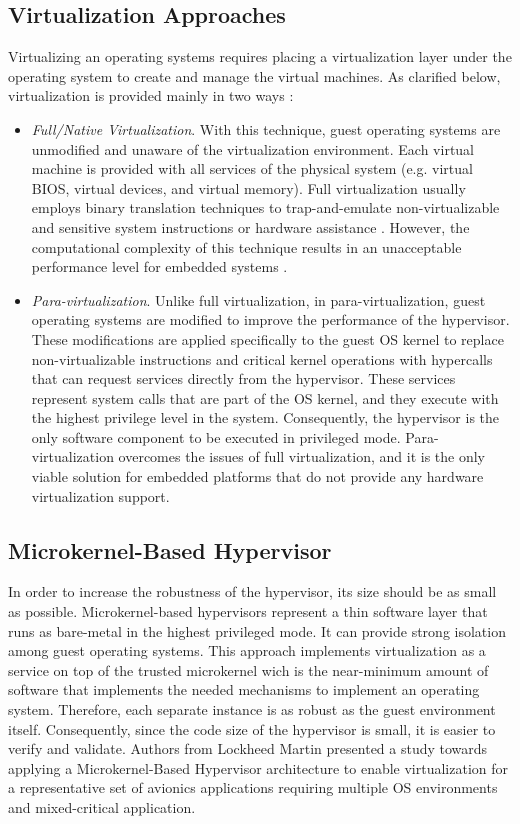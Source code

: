 \subsection{Virtualization Approaches}
Virtualizing an operating systems requires placing a virtualization layer under the operating system to create and manage the virtual machines. As clarified below, virtualization is provided mainly in two ways \cite{practicalmicrokernel}:
\begin{itemize}
\item \emph{Full/Native Virtualization}. With this technique, guest operating systems are unmodified and unaware of the virtualization environment. Each virtual machine is provided with all services of the physical system (e.g. virtual BIOS, virtual devices, and virtual memory). Full virtualization usually employs binary translation techniques to trap-and-emulate non-virtualizable and sensitive system instructions or hardware assistance \cite{vmwarevirtualization}. However, the computational complexity of this technique results in an unacceptable performance level for embedded systems \cite{Kleidermacher2013}.
\item \emph{Para-virtualization}. Unlike full virtualization, in para-virtualization, guest operating systems are modified to improve the performance of the hypervisor. These modifications are applied specifically to the guest OS kernel to replace non-virtualizable instructions and critical kernel operations with hypercalls that can request services directly from the hypervisor. These services represent system calls that are part of the OS kernel, and they execute with the highest privilege level in the system. Consequently, the hypervisor is the only software component to be executed in privileged mode. Para-virtualization overcomes the issues of full virtualization, and it is the only viable solution for embedded platforms that do not provide any hardware virtualization support\cite{Kleidermacher2013}.
\end{itemize}

\subsection{Microkernel-Based Hypervisor}
In order to increase the robustness of the hypervisor, its size should be as small as possible. Microkernel-based hypervisors represent a thin software layer that runs as bare-metal in the highest privileged mode. It can provide strong isolation among guest operating systems. This approach implements virtualization as a service on top of the trusted microkernel wich is the near-minimum amount of software that implements the needed mechanisms to implement an operating system. Therefore, each separate instance is as robust as the guest environment itself. Consequently, since the code size of the hypervisor is small, it is easier to verify and validate. Authors from Lockheed Martin \cite{LockheedMartinVMIMA} presented a study towards applying a Microkernel-Based Hypervisor architecture to enable virtualization for a representative set of avionics applications requiring multiple OS environments and mixed-critical application. 

